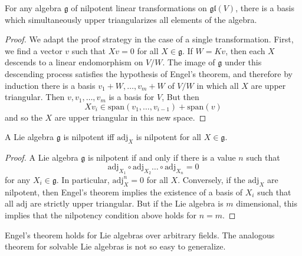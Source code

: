 \begin{theorem}[Engel]
    For any algebra $\mathfrak{g}$ of nilpotent linear transformations on $\mathfrak{gl}(V)$, there is a basis which simultaneously upper triangularizes all elements of the algebra.
\end{theorem}
\begin{proof}
    We adapt the proof strategy in the case of a single transformation. First, we find a vector $v$ such that $Xv = 0$ for all $X \in \mathfrak{g}$. If $W = K v$, then each $X$ descends to a linear endomorphism on $V/W$. The image of $\mathfrak{g}$ under this descending process satisfies the hypothesis of Engel's theorem, and therefore by induction there is a basis $v_1 + W, \dots, v_m + W$ of $V/W$ in which all $X$ are upper triangular. Then $v, v_1, \dots, v_m$ is a basis for $V$, But then
    \[ Xv_i \in \text{span}(v_1, \dots, v_{i-1}) + \text{span}(v) \]
    and so the $X$ are upper triangular in this new space.
\end{proof}

\begin{corollary}
    A Lie algebra $\mathfrak{g}$ is nilpotent iff $\text{adj}_X$ is nilpotent for all $X \in \mathfrak{g}$.
\end{corollary}
\begin{proof}
    A Lie algebra $\mathfrak{g}$ is nilpotent if and only if there is a value $n$ such that
    \[ \text{adj}_{X_1} \circ \text{adj}_{X_2} \dots \circ \text{adj}_{X_n} = 0 \]
    for any $X_i \in \mathfrak{g}$. In particular, $\text{adj}_X^n = 0$ for all $X$. Conversely, if the $\text{adj}_X$ are nilpotent, then Engel's theorem implies the existence of a basis of $X_i$ such that all $\text{adj}$ are strictly upper triangular. But if the Lie algebra is $m$ dimensional, this implies that the nilpotency condition above holds for $n = m$.
\end{proof}

Engel's theorem holds for Lie algebras over arbitrary fields. The analogous theorem for solvable Lie algebras is not so easy to generalize.

